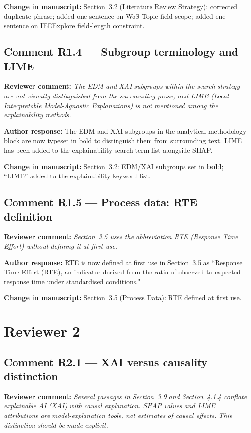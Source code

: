 \documentclass[12pt,a4paper]{article}
\newcommand{\reviewer}[1]{\textcolor{reviewercolor}{\textbf{Reviewer comment:} \textit{#1}}}
\newcommand{\response}[1]{\textcolor{authorcolor}{\textbf{Author response:} #1}}
\newcommand{\change}[1]{\textbf{Change in manuscript:} #1}
\begin{document}
\change{Section~3.2 (Literature Review Strategy): corrected duplicate phrase; added one sentence on WoS Topic field scope; added one sentence on IEEExplore field-length constraint.}

\bigskip

\subsection*{Comment R1.4 — Subgroup terminology and LIME}

\reviewer{The EDM and XAI subgroups within the search strategy are not visually distinguished from the surrounding prose, and LIME (Local Interpretable Model-Agnostic Explanations) is not mentioned among the explainability methods.}

\response{The EDM and XAI subgroups in the analytical-methodology block are now typeset in bold to distinguish them from surrounding text. LIME has been added to the explainability search term list alongside SHAP.}

\change{Section~3.2: EDM/XAI subgroups set in \textbf{bold}; ``LIME'' added to the explainability keyword list.}

\bigskip

\subsection*{Comment R1.5 — Process data: RTE definition}

\reviewer{Section~3.5 uses the abbreviation RTE (Response Time Effort) without defining it at first use.}

\response{RTE is now defined at first use in Section~3.5 as ``Response Time Effort (RTE), an indicator derived from the ratio of observed to expected response time under standardised conditions."}

\change{Section~3.5 (Process Data): RTE defined at first use.}

\bigskip

\section*{Reviewer 2}

\subsection*{Comment R2.1 — XAI versus causality distinction}

\reviewer{Several passages in Section~3.9 and Section~4.1.4 conflate explainable AI (XAI) with causal explanation. SHAP values and LIME attributions are model-explanation tools, not estimates of causal effects. This distinction should be made explicit.}
\end{document}
